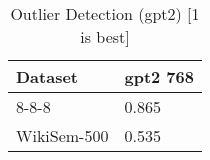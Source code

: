\begin{table}[]
\centering
\begin{tabular}{l|l}
\hline
Dataset & gpt2 768 \\
\hline
8-8-8 & 0.865 \\ 
WikiSem-500 & 0.535
\end{tabular}
\caption{Outlier Detection (gpt2) [1 is best]}
\label{tab:outlier-gpt2}
\end{table}
